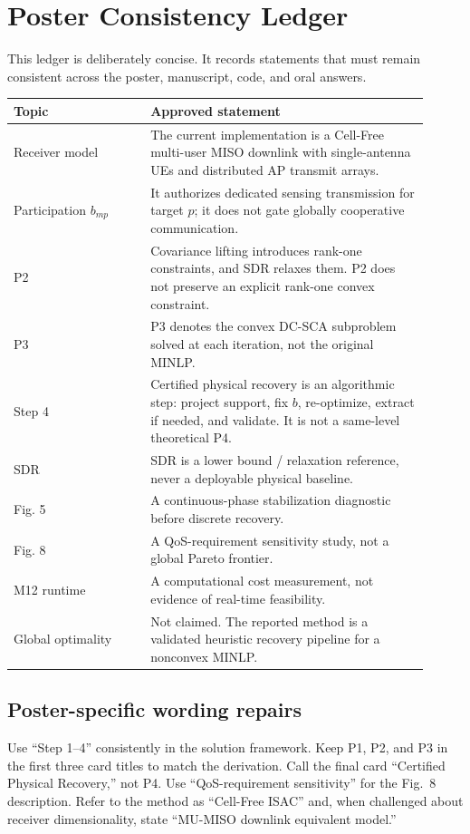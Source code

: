 \chapter{Poster Consistency Ledger}

This ledger is deliberately concise. It records statements that must remain
consistent across the poster, manuscript, code, and oral answers.

\begin{longtable}{p{0.30\linewidth}p{0.61\linewidth}}
\toprule
Topic & Approved statement\\ \midrule
Receiver model & The current implementation is a Cell-Free multi-user MISO downlink with single-antenna UEs and distributed AP transmit arrays.\\
Participation $b_{mp}$ & It authorizes dedicated sensing transmission for target $p$; it does not gate globally cooperative communication.\\
P2 & Covariance lifting introduces rank-one constraints, and SDR relaxes them. P2 does not preserve an explicit rank-one convex constraint.\\
P3 & P3 denotes the convex DC-SCA subproblem solved at each iteration, not the original MINLP.\\
Step 4 & Certified physical recovery is an algorithmic step: project support, fix $b$, re-optimize, extract if needed, and validate. It is not a same-level theoretical P4.\\
SDR & SDR is a lower bound / relaxation reference, never a deployable physical baseline.\\
Fig. 5 & A continuous-phase stabilization diagnostic before discrete recovery.\\
Fig. 8 & A QoS-requirement sensitivity study, not a global Pareto frontier.\\
M12 runtime & A computational cost measurement, not evidence of real-time feasibility.\\
Global optimality & Not claimed. The reported method is a validated heuristic recovery pipeline for a nonconvex MINLP.\\
\bottomrule
\end{longtable}

\section{Poster-specific wording repairs}
Use ``Step 1--4'' consistently in the solution framework. Keep P1, P2, and P3
in the first three card titles to match the derivation. Call the final card
``Certified Physical Recovery,'' not P4. Use ``QoS-requirement sensitivity''
for the Fig.~8 description. Refer to the method as ``Cell-Free ISAC'' and,
when challenged about receiver dimensionality, state ``MU-MISO downlink
equivalent model.''
